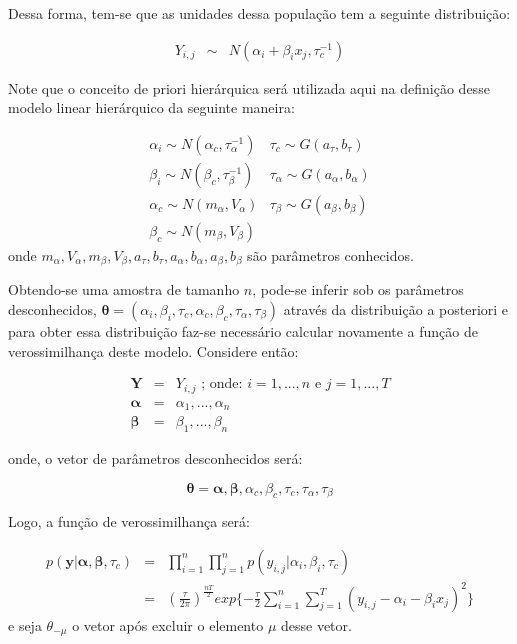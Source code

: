 \documentclass[12pt,a4paper,header]{abnt}
\def\bs{\boldsymbol}
\begin{document}
Dessa forma, tem-se que as unidades dessa população tem a seguinte distribuição:

\begin{eqnarray}
Y_{i,j} & \sim & N( \alpha_i +\beta_i x_j , \tau_c^{-1})
\label{Met::modhierarquico}
\end{eqnarray}

Note que o conceito de priori hierárquica será utilizada aqui na definição desse modelo linear hierárquico da seguinte maneira:

\begin{eqnarray}
\alpha_{i}  \sim  N( \alpha_c , \tau_\alpha^{-1}) & \tau_c  \sim  G( a_\tau , b_\tau)    \nonumber \\
\beta_{i}  \sim  N( \beta_c , \tau_\beta^{-1})    & \tau_\alpha  \sim G( a_\alpha , b_\alpha)    \nonumber \\
\alpha_{c}  \sim  N( m_\alpha , V_\alpha)         & \tau_\beta  \sim G( a_\beta , b_\beta)    \nonumber \\
\beta_{c}  \sim  N( m_\beta , V_\beta)               \label{priorisMLH}
\end{eqnarray}
onde $m_\alpha, V_\alpha, m_\beta, V_\beta, a_\tau, b_\tau, a_\alpha, b_\alpha, a_\beta, b_\beta$ são parâmetros conhecidos.


Obtendo-se uma amostra de tamanho $n$, pode-se inferir sob os parâmetros desconhecidos, $\bs{\theta} = (\alpha_i, \beta_i, \tau_c, \alpha_c, \beta_c, \tau_\alpha, \tau_\beta)$ através da distribuição a posteriori e para obter essa distribuição faz-se necessário calcular novamente a função de verossimilhança deste modelo. Considere então:

\begin{eqnarray}
\bs{Y} &=& {Y_{i,j} \text{ ; onde: }i=1,...,n\text{ e }j=1,...,T} \\
\bs{\alpha} &=& {\alpha_1,...,\alpha_n}      \\
\bs{\beta} &=& {\beta_1,...,\beta_n}
\end{eqnarray}

onde, o vetor de parâmetros desconhecidos será:

$$
\bs{\theta}={\bs{\alpha},\bs{\beta}, \alpha_c, \beta_c, \tau_c, \tau_\alpha, \tau_\beta}
$$

Logo, a função de verossimilhança será:

\begin{eqnarray}
p(\bs{y} | \bs{\alpha}, \bs{\beta}, \tau_c) &=& \prod^n_{i=1} \prod^n_{j=1} p(y_{i,j} |
\alpha_i, \beta_i, \tau_c)\\
&=&(\frac{\tau}{2\pi})^\frac{nT}{2} exp\{-\frac{\tau}{2} \sum^n_{i=1} \sum^T_{j=1} (y_{i,j} -\alpha_i -\beta_ix_j )^2 \}
\end{eqnarray}
e seja $\theta_{-\mu}$ o vetor após excluir o elemento $\mu$ desse vetor.
\end{document}
